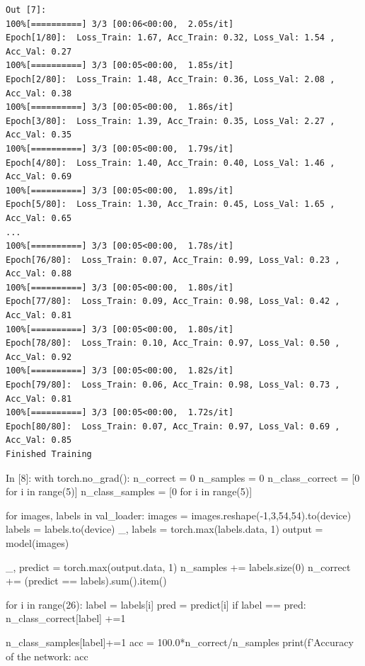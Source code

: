 \documentclass[12pt, a4paper]{article}
\begin{document}
\begin{verbatim}
Out [7]:
100%[==========] 3/3 [00:06<00:00,  2.05s/it]
Epoch[1/80]:  Loss_Train: 1.67, Acc_Train: 0.32, Loss_Val: 1.54 , Acc_Val: 0.27
100%[==========] 3/3 [00:05<00:00,  1.85s/it]
Epoch[2/80]:  Loss_Train: 1.48, Acc_Train: 0.36, Loss_Val: 2.08 , Acc_Val: 0.38
100%[==========] 3/3 [00:05<00:00,  1.86s/it]
Epoch[3/80]:  Loss_Train: 1.39, Acc_Train: 0.35, Loss_Val: 2.27 , Acc_Val: 0.35
100%[==========] 3/3 [00:05<00:00,  1.79s/it]
Epoch[4/80]:  Loss_Train: 1.40, Acc_Train: 0.40, Loss_Val: 1.46 , Acc_Val: 0.69
100%[==========] 3/3 [00:05<00:00,  1.89s/it]
Epoch[5/80]:  Loss_Train: 1.30, Acc_Train: 0.45, Loss_Val: 1.65 , Acc_Val: 0.65
...
100%[==========] 3/3 [00:05<00:00,  1.78s/it]
Epoch[76/80]:  Loss_Train: 0.07, Acc_Train: 0.99, Loss_Val: 0.23 , Acc_Val: 0.88
100%[==========] 3/3 [00:05<00:00,  1.80s/it]
Epoch[77/80]:  Loss_Train: 0.09, Acc_Train: 0.98, Loss_Val: 0.42 , Acc_Val: 0.81
100%[==========] 3/3 [00:05<00:00,  1.80s/it]
Epoch[78/80]:  Loss_Train: 0.10, Acc_Train: 0.97, Loss_Val: 0.50 , Acc_Val: 0.92
100%[==========] 3/3 [00:05<00:00,  1.82s/it]
Epoch[79/80]:  Loss_Train: 0.06, Acc_Train: 0.98, Loss_Val: 0.73 , Acc_Val: 0.81
100%[==========] 3/3 [00:05<00:00,  1.72s/it]
Epoch[80/80]:  Loss_Train: 0.07, Acc_Train: 0.97, Loss_Val: 0.69 , Acc_Val: 0.85
Finished Training
\end{verbatim}


\begin{python}
In [8]: with torch.no_grad():
            n_correct = 0
            n_samples = 0
            n_class_correct = [0 for i in range(5)]
            n_class_samples = [0 for i in range(5)]
            
            for images, labels in val_loader:
                images = images.reshape(-1,3,54,54).to(device)
                labels = labels.to(device)
                _, labels = torch.max(labels.data, 1)
                output = model(images)
                
                _, predict = torch.max(output.data, 1)
                n_samples += labels.size(0)
                n_correct += (predict == labels).sum().item()
                
                for i in range(26):
                    label = labels[i]
                    pred = predict[i]
                    if label == pred:
                        n_class_correct[label] +=1
                        
                    n_class_samples[label]+=1
            acc = 100.0*n_correct/n_samples
            print(f'Accuracy of the network: {acc} %
\end{python}
\end{document}
